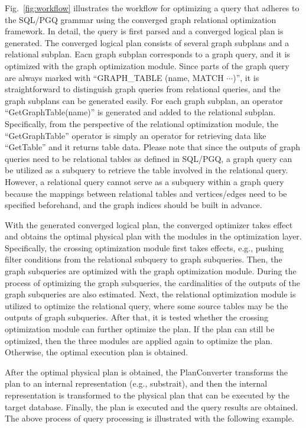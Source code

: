 Fig.~\ref{fig:workflow} illustrates the workflow for optimizing a query that adheres to the SQL/PGQ grammar using the converged graph relational optimization framework.
In detail, the query is first parsed and a converged logical plan is generated.
The converged logical plan consists of several graph subplans and a relational subplan.
Eacn graph subplan corresponds to a graph query, and it is optimized with the graph optimization module.
Since parts of the graph query are always marked with ``GRAPH\_TABLE (name, MATCH $\cdots$)'', it is straightforward to distinguish graph queries from relational queries, and the graph subplans can be generated easily.
For each graph subplan, an operator ``GetGraphTable(name)'' is generated and added to the relational subplan.
Specifically, from the perspective of the relational optimization module, the ``GetGraphTable'' operator is simply an operator for retrieving data like ``GetTable'' and it returns table data.
Please note that since the outputs of graph queries need to be relational tables as defined in SQL/PGQ, a graph query can be utilized as a subquery to retrieve the table involved in the relational query.
However, a relational query cannot serve as a subquery within a graph query because the mappings between relational tables and vertices/edges need to be specified beforehand, and the graph indices should be built in advance.


With the generated converged logical plan, the converged optimizer takes effect and obtains the optimal physical plan with the modules in the optimization layer.
Specifically, the crossing optimization module first takes effects, e.g., pushing filter conditions from the relational subquery to graph subqueries.
Then, the graph subqueries are optimized with the graph optimization module.
During the process of optimizing the graph subqueries, the cardinalities of the outputs of the graph subqueries are also estimated.
Next, the relational optimization module is utilized to optimize the relational query, where some source tables may be the outputs of graph subqueries.
After that, it is tested whether the crossing optimization module can further optimize the plan.
If the plan can still be optimized, then the three modules are applied again to optimize the plan.
Otherwise, the optimal execution plan is obtained.

After the optimal physical plan is obtained, the PlanConverter transforms the plan to an internal representation (e.g., substrait), and then the internal representation is transformed to the physical plan that can be executed by the target database.
Finally, the plan is executed and the query results are obtained.
The above process of query processing is illustrated with the following example.

